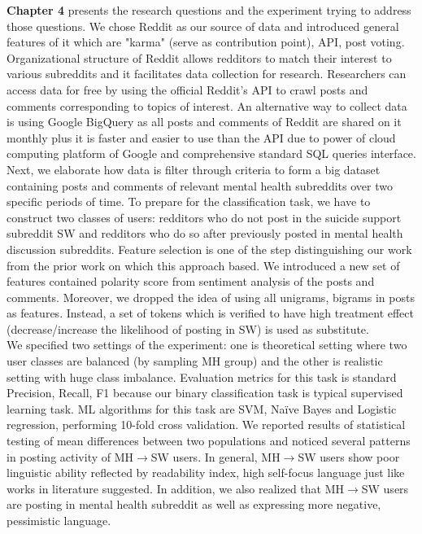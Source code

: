 \textbf{Chapter 4} presents the research questions and the experiment trying to address those questions. We chose Reddit as our source of data and introduced general features of it which are "karma" (serve as contribution point), API, post voting. Organizational structure of Reddit allows redditors to match their interest to various subreddits and it facilitates data collection for research. Researchers can access data for free by using the official Reddit's API to crawl posts and comments corresponding to topics of interest. An alternative way to collect data is using Google BigQuery as all posts and comments of Reddit are shared on it monthly plus it is faster and easier to use than the API due to power of cloud computing platform of Google and comprehensive standard SQL queries interface. \\
Next, we elaborate how data is filter through criteria to form a big dataset containing posts and comments of relevant mental health subreddits over two specific periods of time. To prepare for the classification task, we have to construct two classes of users: redditors who do not post in the suicide support subreddit SW and redditors who do so after previously posted in mental health discussion subreddits. Feature selection is one of the step distinguishing our work from the prior work on which this approach based. We introduced a new set of features contained polarity score from sentiment analysis of the posts and comments. Moreover, we dropped the idea of using all unigrams, bigrams in posts as features. Instead, a set of tokens which is verified to have high treatment effect (decrease/increase the likelihood of posting in SW) is used as substitute. \\
We specified two settings of the experiment: one is theoretical setting where two user classes are balanced (by sampling MH group) and the other is realistic setting with huge class imbalance. Evaluation metrics for this task is standard Precision, Recall, F1 because our binary classification task is typical supervised learning task. ML algorithms for this task are SVM, Na\"ive Bayes and Logistic regression, performing 10-fold cross validation. We reported results of statistical testing of mean differences between two populations and noticed several patterns in posting activity of MH$\rightarrow$SW users. In general, MH$\rightarrow$SW users show poor linguistic ability reflected by readability index, high self-focus language just like works in literature suggested. In addition, we also realized that MH$\rightarrow$SW users are posting in mental health subreddit as well as expressing more negative, pessimistic language.\\
